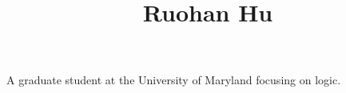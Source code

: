 \documentclass[a4paper]{article}
\title{Ruohan Hu}
\date{}
\begin{document}
\maketitle
\par{A graduate student at the University of Maryland focusing on logic.}
\printbibliography
\end{document}
